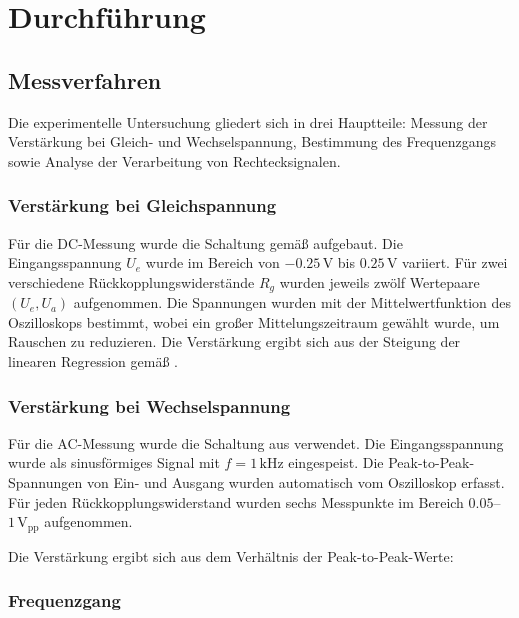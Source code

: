 \chapter{Durchführung} \label{ch:Durchfuehrung}

\section{Messverfahren}
\label{sec:Messverfahren}

Die experimentelle Untersuchung gliedert sich in drei Hauptteile: Messung der Verstärkung bei Gleich- und Wechselspannung, Bestimmung des Frequenzgangs sowie Analyse der Verarbeitung von Rechtecksignalen.

\subsection*{Verstärkung bei Gleichspannung}
Für die DC-Messung wurde die Schaltung gemäß  aufgebaut. Die Eingangsspannung $U_e$ wurde im Bereich von $-0.25\,\mathrm{V}$ bis $0.25\,\mathrm{V}$ variiert. Für zwei verschiedene Rückkopplungswiderstände $R_g$ wurden jeweils zwölf Wertepaare $(U_e, U_a)$ aufgenommen. 
Die Spannungen wurden mit der Mittelwertfunktion des Oszilloskops bestimmt, wobei ein großer Mittelungszeitraum gewählt wurde, um Rauschen zu reduzieren. Die Verstärkung ergibt sich aus der Steigung der linearen Regression gemäß .


\subsection*{Verstärkung bei Wechselspannung}
Für die AC-Messung wurde die Schaltung aus  verwendet. Die Eingangsspannung wurde als sinusförmiges Signal mit $f = 1\,\mathrm{kHz}$ eingespeist. Die Peak-to-Peak-Spannungen von Ein- und Ausgang wurden automatisch vom Oszilloskop erfasst. Für jeden Rückkopplungswiderstand wurden sechs Messpunkte im Bereich $0.05$–$1\,\mathrm{V_{pp}}$ aufgenommen.


Die Verstärkung ergibt sich aus dem Verhältnis der Peak-to-Peak-Werte:

\subsection*{Frequenzgang}

